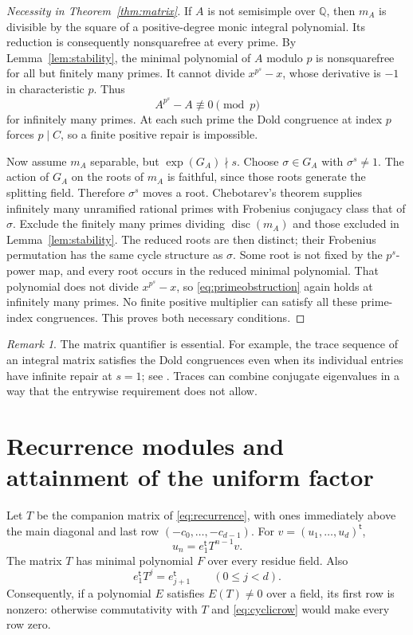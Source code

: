 \documentclass[11pt]{article}
\theoremstyle{remark}
\newtheorem{remark}[theorem]{Remark}
\newcommand{\disc}{\operatorname{disc}}
\newcommand{\Q}{\mathbb Q}
\begin{document}
\begin{proof}[Necessity in Theorem~\ref{thm:matrix}]
If $A$ is not semisimple over $\Q$, then $m_A$ is divisible by the square of a positive-degree monic integral polynomial. Its reduction is consequently nonsquarefree at every prime. By Lemma~\ref{lem:stability}, the minimal polynomial of $A$ modulo $p$ is nonsquarefree for all but finitely many primes. It cannot divide $x^{p^s}-x$, whose derivative is $-1$ in characteristic $p$. Thus
\begin{equation}\label{eq:primeobstruction}
 A^{p^s}-A\not\equiv0\pmod p
\end{equation}
for infinitely many primes. At each such prime the Dold congruence at index $p$ forces $p\mid C$, so a finite positive repair is impossible.

Now assume $m_A$ separable, but $\exp(G_A)\nmid s$. Choose $\sigma\in G_A$ with $\sigma^s\neq1$. The action of $G_A$ on the roots of $m_A$ is faithful, since those roots generate the splitting field. Therefore $\sigma^s$ moves a root. Chebotarev's theorem \cite[Theorem~8.31]{Milne} supplies infinitely many unramified rational primes with Frobenius conjugacy class that of $\sigma$. Exclude the finitely many primes dividing $\disc(m_A)$ and those excluded in Lemma~\ref{lem:stability}. The reduced roots are then distinct; their Frobenius permutation has the same cycle structure as $\sigma$. Some root is not fixed by the $p^s$-power map, and every root occurs in the reduced minimal polynomial. That polynomial does not divide $x^{p^s}-x$, so \eqref{eq:primeobstruction} again holds at infinitely many primes. No finite positive multiplier can satisfy all these prime-index congruences. This proves both necessary conditions.
\end{proof}

\begin{remark}
The matrix quantifier is essential. For example, the trace sequence of an integral matrix satisfies the Dold congruences even when its individual entries have infinite repair at $s=1$; see \cite{BGW}. Traces can combine conjugate eigenvalues in a way that the entrywise requirement does not allow.
\end{remark}

\section{Recurrence modules and attainment of the uniform factor}
Let $T$ be the companion matrix of \eqref{eq:recurrence}, with ones immediately above the main diagonal and last row $(-c_0,\ldots,-c_{d-1})$. For $v=(u_1,\ldots,u_d)^{\mathsf t}$,
\begin{equation}\label{eq:observation}
 u_n=e_1^{\mathsf t}T^{n-1}v.
\end{equation}
The matrix $T$ has minimal polynomial $F$ over every residue field. Also
\begin{equation}\label{eq:cyclicrow}
 e_1^{\mathsf t}T^j=e_{j+1}^{\mathsf t}\qquad(0\leq j<d).
\end{equation}
Consequently, if a polynomial $E$ satisfies $E(T)\neq0$ over a field, its first row is nonzero: otherwise commutativity with $T$ and \eqref{eq:cyclicrow} would make every row zero.
\end{document}
